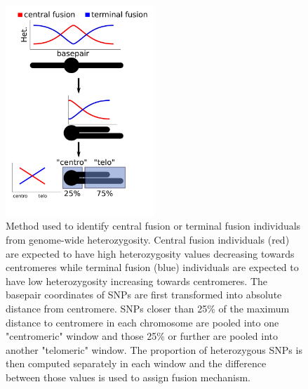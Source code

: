\documentclass[10pt,a4paper]{report}
\begin{document}
\begin{figure}[h]
	\begin{center}
		\includegraphics[width=0.5\textwidth]{Num_CSD_loci/cen_tel.pdf}
		\caption{Method used to identify central fusion or terminal fusion individuals from genome-wide heterozygosity. Central fusion individuals (red) are expected to have high heterozygosity values decreasing towards centromeres while terminal fusion (blue) individuals are expected to have low heterozygosity increasing towards centromeres. The basepair coordinates of SNPs are first transformed into absolute distance from centromere. SNPs closer than 25\% of the maximum distance to centromere in each chromosome are pooled into one "centromeric" window and those 25\% or further are pooled into another "telomeric" window. The proportion of heterozygous SNPs is then computed separately in each window and the difference between those values is used to assign fusion mechanism.}
		\label{schema_cen_tel}
	\end{center}
\end{figure}
\end{document}
